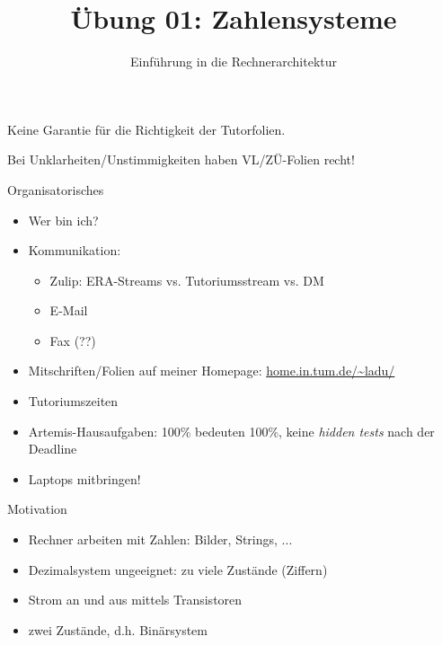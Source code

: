 

\title{Übung 01: Zahlensysteme}
\subtitle{Einführung in die Rechnerarchitektur}
\date{}



\maketitle

\begin{frame}[c]{}{}
	\begin{center}
		\LARGE  Keine Garantie für die Richtigkeit der Tutorfolien.

		\Large Bei Unklarheiten/Unstimmigkeiten haben VL/ZÜ-Folien recht!
	\end{center}
\end{frame}

\begin{frame}[c]{Organisatorisches}{}
	\begin{itemize}
		\item Wer bin ich?
		\item Kommunikation:
		      \begin{itemize}
			      \item Zulip: ERA-Streams vs. Tutoriumsstream vs. DM
			      \item E-Mail
			      \item Fax (??)
		      \end{itemize}
		\item Mitschriften/Folien auf meiner Homepage: \url{home.in.tum.de/~ladu/}
		\item Tutoriumszeiten
		\item Artemis-Hausaufgaben: 100\% bedeuten 100\%, keine \emph{hidden tests} nach der Deadline
		\item Laptops mitbringen!
	\end{itemize}
\end{frame}

\begin{frame}[c]{Motivation}{}
	\begin{itemize}
		\item Rechner arbeiten mit Zahlen: Bilder, Strings, ...
		\item Dezimalsystem ungeeignet: zu viele Zustände (Ziffern)
		\item Strom an und aus mittels Transistoren
		\item zwei Zustände, d.h. Binärsystem
	\end{itemize}
\end{frame}


